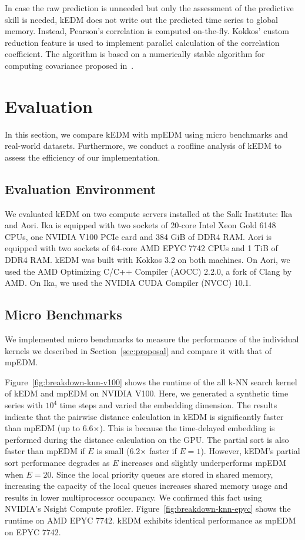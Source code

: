 \documentclass[sigconf]{acmart}
\begin{document}
In case the raw prediction is unneeded but only the assessment of the
predictive skill is needed, kEDM does not write out the predicted time series
to global memory. Instead, Pearson’s correlation is computed on-the-fly.
Kokkos’ custom reduction feature is used to implement parallel calculation of the
correlation coefficient. The algorithm is based on a numerically stable
algorithm for computing covariance proposed in~\cite{Schubert2018}.

\section{Evaluation}\label{sec:evaluation}

In this section, we compare kEDM with mpEDM using micro benchmarks and
real-world datasets. Furthermore, we conduct a roofline analysis of kEDM to
assess the efficiency of our implementation.

\subsection{Evaluation Environment}


We evaluated kEDM on two compute servers installed at the Salk Institute: Ika and Aori.
Ika is equipped with two sockets of 20-core Intel Xeon Gold
6148 CPUs, one NVIDIA V100 PCIe card and 384 GiB of DDR4 RAM\@. Aori is equipped with
two sockets of 64-core AMD EPYC 7742 CPUs and 1 TiB of DDR4 RAM\@. kEDM was built
with Kokkos 3.2 on both machines. On Aori, we used the AMD Optimizing C/C++
Compiler (AOCC) 2.2.0, a fork of Clang by AMD. On Ika, we used the NVIDIA CUDA
Compiler (NVCC) 10.1.

\subsection{Micro Benchmarks}

We implemented micro benchmarks to measure the performance of the individual
kernels we described in Section~\ref{sec:proposal} and compare it with that of
mpEDM\@.

Figure~\ref{fig:breakdown-knn-v100} shows the runtime of the all k-NN search kernel
of kEDM and mpEDM on NVIDIA V100. Here, we generated a synthetic time series with
$10^4$ time steps and varied the embedding dimension.
The results indicate that the pairwise
distance calculation in kEDM is significantly faster than mpEDM (up to
6.6$\times$). This is because the time-delayed embedding is performed during the distance
calculation on the GPU\@. The partial sort is also faster than mpEDM if $E$ is small
(6.2$\times$ faster if $E=1$). However, kEDM's partial sort performance degrades as
$E$ increases and  slightly underperforms mpEDM when $E=20$. Since the local
priority queues are stored in shared memory, increasing the capacity of the local
queues increases shared memory usage and results in lower multiprocessor
occupancy. We confirmed this fact using NVIDIA's Nsight Compute profiler.
Figure~\ref{fig:breakdown-knn-epyc} shows the runtime on AMD EPYC 7742. kEDM
exhibits identical performance as mpEDM on EPYC 7742.
\end{document}
